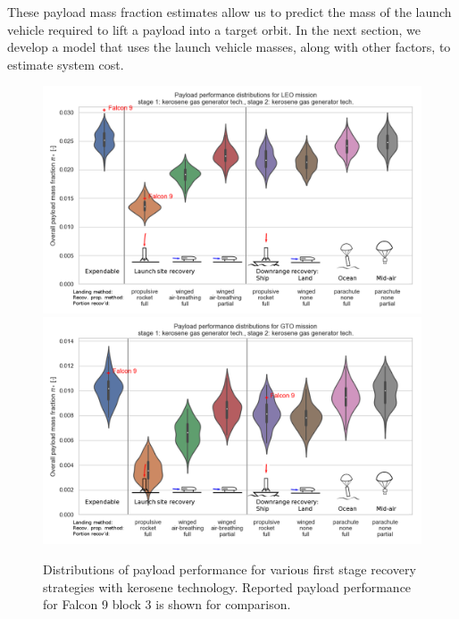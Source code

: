 \documentclass[conf]{new-aiaa}
\begin{document}
These payload mass fraction estimates allow us to predict the mass of the launch vehicle required to lift a payload into a target orbit. In the next section, we develop a model that uses the launch vehicle masses, along with other factors, to estimate system cost.

\begin{figure}[hbt!]
    \centering
    \includegraphics[width=\textwidth]{strategy_perf_annotated/LEO_kero}
    \includegraphics[width=\textwidth]{strategy_perf_annotated/GTO_kero}
    \caption{\label{fig:strategy_perf_kerosene} Distributions of payload performance for various first stage recovery strategies with kerosene technology. Reported payload performance for Falcon 9 block 3 is shown for comparison.}
\end{figure}
\end{document}

